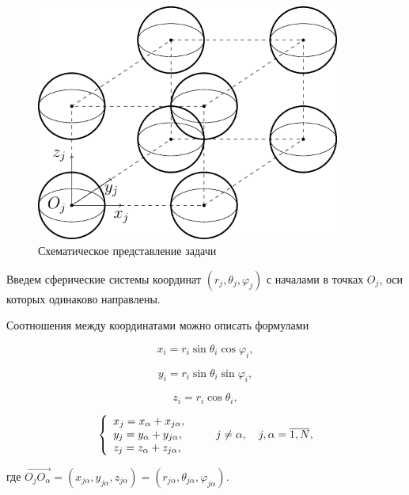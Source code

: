 \begin{figure}[h!]
\centering
\includegraphics[width=10cm]{cartesian-spheres.pdf}
\caption{Схематическое представление задачи}
\label{f:8:5}
\end{figure}

Введем сферические системы координат $(r_j,\theta_j,\varphi_j)$ с началами в точках $O_j$, оси которых одинаково направлены.

Соотношения между координатами можно описать формулами

\begin{equation*}
{x_i} = {r_i}\sin {\theta _i}\cos {\varphi _i},
\end{equation*}

\begin{equation}
{y_i} = {r_i}\sin {\theta _i}\sin {\varphi _i},
\label{eq:8:1}
\end{equation}

\begin{equation*}
{z_i} = {r_i}\cos {\theta _i},
\end{equation*}

\begin{equation}
\left\{ {\begin{array}{*{20}{l}}
{{x_j} = {x_\alpha } + {x_{j\alpha }},}\\
{{y_j} = {y_\alpha } + {y_{j\alpha }},}\\
{{z_j} = {z_\alpha } + {z_{j\alpha }},}
\end{array}} \right.\qquad {\kern 1pt} j \ne \alpha ,\quad j,\alpha  = \overline {1,N},
\label{eq:8:2}
\end{equation}

\noindent где $\overrightarrow {{O_j}{O_\alpha }}  = \left( {{x_{j\alpha }},{y_{j\alpha }},{z_{j\alpha }}} \right) = \left( {{r_{j\alpha }},{\theta _{j\alpha }},{\varphi _{j\alpha }}} \right)$.

